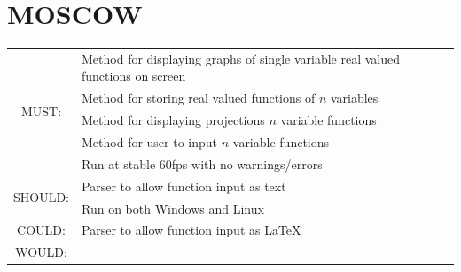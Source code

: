 \documentclass{article}
\newlength{\headerwidth}
\begin{document}
{\section{MOSCOW}
\begin{tabularx}{\headerwidth}{|c|X|} 
	\hline
		  \multirow{5}{*}{ MUST: } 
		& { Method for displaying graphs of single variable real valued functions on screen } \\
	\cline{2-2}
		& { Method for storing real valued functions of $n$ variables } \\
	\cline{2-2}
		& { Method for displaying projections $n$ variable functions } \\
	\cline{2-2}
		& { Method for user to input $n$ variable functions } \\
	\cline{2-2}
		& { Run at stable 60fps with no warnings/errors } \\
	\hline
		\multirow{2}{*}{ SHOULD: }
		& { Parser to allow function input as text } \\
	\cline{2-2}
		& { Run on both Windows and Linux } \\
	\hline
		\multirow{1}{*}{ COULD: }
		& { Parser to allow function input as \LaTeX } \\
	\hline
		\multirow{1}{*}{ WOULD: }
		& {  } \\
	\hline
\end{tabularx}

} 
\end{document}
